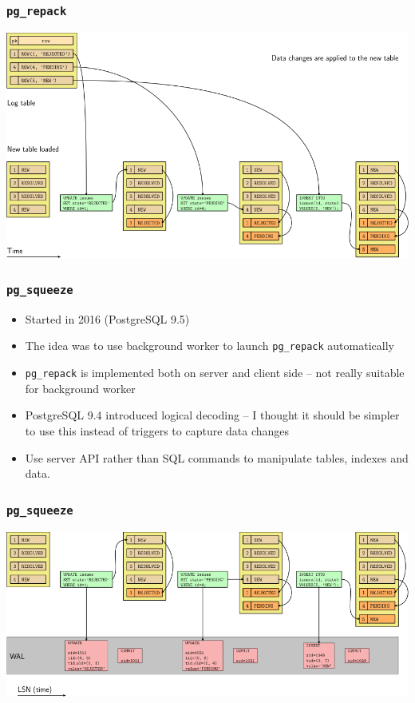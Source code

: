 \begin{frame}
  \frametitle{\texttt{pg\_repack}}
  \begin{center}
\includegraphics[height=\sizeforimages\textheight]{pg_repack_02.png}
  \end{center}
\end{frame}

\begin{frame}
        \frametitle{\texttt{pg\_squeeze}}
  \begin{itemize}
    \item Started in 2016 (PostgreSQL 9.5)
    \item The idea was to use background worker to launch \texttt{pg\_repack} automatically
    \item \texttt{pg\_repack} is implemented both on server and client side --
      not really suitable for background worker
    \item PostgreSQL 9.4 introduced logical decoding -- I thought it should be
      simpler to use this instead of triggers to capture data changes
    \item Use server API rather than SQL commands to manipulate tables,
      indexes and data.
  \end{itemize}
\end{frame}

\begin{frame}
  \frametitle{\texttt{pg\_squeeze}}
  \begin{center}
\includegraphics[height=\sizeforimages\textheight]{pg_squeeze_01.png}
  \end{center}
\end{frame}

